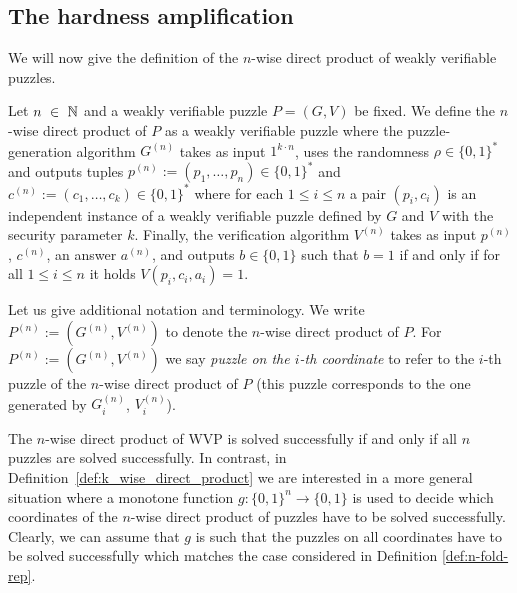 \subsection{The hardness amplification}
We will now give the definition of the $n$-wise direct product of weakly verifiable puzzles.
%
\begin{definition}
  \label{def:n-fold-rep}
  Let $n~\in~\mathbb{N}$ and a weakly verifiable puzzle $P = (G,V)$ be fixed.
  We define the $n$-wise direct product of $P$ as a weakly verifiable puzzle where the puzzle-generation algorithm
  $G^{(n)}$ takes as input $1^{k \cdot n}$, uses the randomness $\rho \in \{0,1\}^{*}$
  and outputs tuples $p^{(n)} := (p_1, \dotsc, p_n) \in \{0,1\}^{*}$ and $c^{(n)} := (c_1, \dotsc, c_k) \in \{0,1\}^{*}$
  where for each $1 \leq i \leq n$ a pair $(p_i, c_i)$ is an independent instance of a weakly verifiable puzzle defined by $G$ and $V$ with the security parameter $k$.
  Finally, the verification algorithm $V^{(n)}$ takes as input $p^{(n)}$, $c^{(n)}$, an answer $a^{(n)}$, and outputs $b \in \{0,1\}$
  such that $b = 1$ if and only if for all $1 \leq i \leq n$ it holds $V(p_i, c_i, a_i) = 1$.
 \end{definition}
%
Let us give additional notation and terminology. We write $P^{(n)} := (G^{(n)}, V^{(n)})$ to denote the $n$-wise direct product of $P$.
For $P^{(n) } := (G^{(n)},V^{(n)})$ we say \textit{puzzle on the $i$-th coordinate} to refer to the $i$-th puzzle of the $n$-wise direct product of $P$
(this puzzle corresponds to the one generated by $G^{(n)}_i$,  $V^{(n)}_i$).

The $n$-wise direct product of WVP is solved successfully if and only if all $n$ puzzles are solved successfully.
In contrast, in Definition~\ref{def:k_wise_direct_product} we are interested in a more general situation where a monotone function $g: \{0,1\}^{n} \rightarrow \{0,1\}$
is used to decide which coordinates of the $n$-wise direct product of puzzles have to be solved successfully.
Clearly, we can assume that $g$ is such that the puzzles on all coordinates have to be solved successfully
which matches the case considered in Definition \ref{def:n-fold-rep}.

